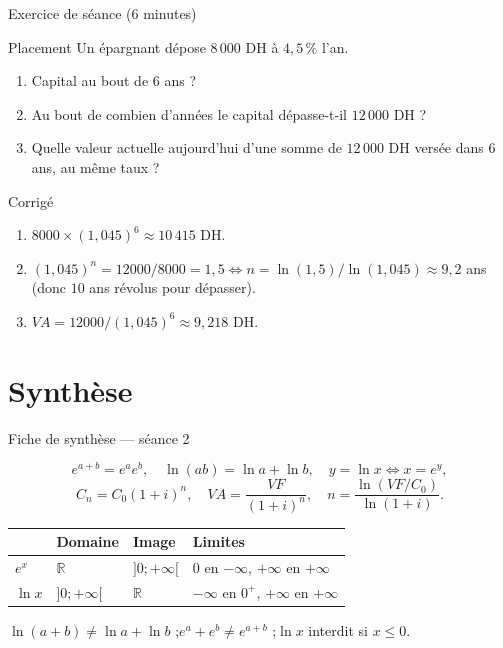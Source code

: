 \documentclass[10pt,aspectratio=169]{beamer}
\numberwithin{dummy}{section}
\newcommand{\R}{\mathbb{R}}
\begin{document}
\begin{frame}{Exercice de séance (6 minutes)}
\begin{alertblock}{Placement}
Un épargnant dépose $8\,000$ DH à $4{,}5\,\%$ l'an.
\begin{enumerate}
    \item Capital au bout de $6$ ans ?
    \item Au bout de combien d'années le capital dépasse-t-il $12\,000$ DH ?
    \item Quelle valeur actuelle aujourd'hui d'une somme de $12\,000$ DH versée dans $6$ ans,
    au même taux ?
\end{enumerate}
\end{alertblock}

\pause
{\small
\begin{block}{Corrigé}
\begin{enumerate}
    \item $8000\times(1{,}045)^6\approx 10\,415$ DH.
    \item $(1{,}045)^n=12000/8000=1{,}5 \iff n=\ln(1{,}5)/\ln(1{,}045)\approx 9{,}2$ ans
    (donc $10$ ans révolus pour dépasser).
    \item $VA=12000/(1{,}045)^6\approx 9{,}218$ DH.
\end{enumerate}
\end{block}
}
\end{frame}

\section{Synthèse}

\begin{frame}{Fiche de synthèse --- séance 2}
\begin{boxsynthese}
\[
e^{a+b}=e^ae^b,\quad
\ln(ab)=\ln a+\ln b,\quad
y=\ln x \iff x=e^y,
\]
\[
C_n=C_0(1+i)^n,\quad
VA=\frac{VF}{(1+i)^n},\quad
n=\frac{\ln(VF/C_0)}{\ln(1+i)}.
\]
\end{boxsynthese}

\vspace{0.25em}
\renewcommand{\arraystretch}{1.2}
{\small
\begin{center}
\begin{tabular}{@{}llll@{}}
\toprule
 & \textbf{Domaine} & \textbf{Image} & \textbf{Limites} \\
\midrule
$e^x$ & $\R$ & $]0;+\infty[$ & $0$ en $-\infty$, $+\infty$ en $+\infty$ \\
$\ln x$ & $]0;+\infty[$ & $\R$ & $-\infty$ en $0^+$, $+\infty$ en $+\infty$ \\
\bottomrule
\end{tabular}
\end{center}
}

\vspace{0.3em}
\begin{boxattention}[Pièges]
$\ln(a+b)\neq\ln a+\ln b$ ;\quad $e^a+e^b\neq e^{a+b}$ ;\quad $\ln x$ interdit si $x\leqslant 0$.
\end{boxattention}
\end{frame}
\end{document}
